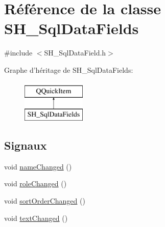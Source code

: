 \hypertarget{classSH__SqlDataFields}{\section{Référence de la classe S\-H\-\_\-\-Sql\-Data\-Fields}
\label{classSH__SqlDataFields}
}


{\ttfamily \#include $<$S\-H\-\_\-\-Sql\-Data\-Field.\-h$>$}

Graphe d'héritage de S\-H\-\_\-\-Sql\-Data\-Fields\-:\begin{figure}[H]
\begin{center}
\leavevmode
\includegraphics[height=2.000000cm]{classSH__SqlDataFields}
\end{center}
\end{figure}
\subsection*{Signaux}
\begin{DoxyCompactItemize}
\item 
void \hyperlink{classSH__SqlDataFields_a2769afd59dde74e989bc28ed98bb04d8}{name\-Changed} ()
\item 
void \hyperlink{classSH__SqlDataFields_a6059e1ea44ad77f9b7b92e3c5e0da99c}{role\-Changed} ()
\item 
void \hyperlink{classSH__SqlDataFields_a0b98b00a8e7eb421e423c15bddd12e36}{sort\-Order\-Changed} ()
\item 
void \hyperlink{classSH__SqlDataFields_ae9e241e4389dd1e2fd4f7c7d797c1ab0}{text\-Changed} ()
\end{DoxyCompactItemize}
